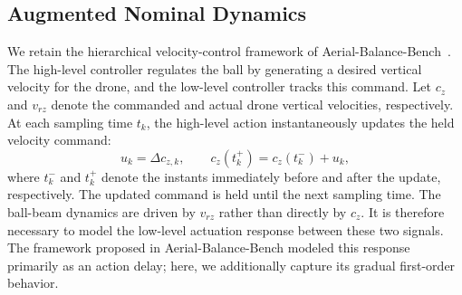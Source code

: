 \documentclass[letterpaper, 10 pt, conference]{ieeeconf}  %
\begin{document}
\subsection{Augmented Nominal Dynamics}
We retain the hierarchical velocity-control framework of Aerial-Balance-Bench~\cite{liu2026aerialBalanceBench}.
The high-level controller regulates the ball by generating a desired vertical velocity for the drone, and the
low-level controller tracks this command. Let $c_z$ and $v_{rz}$ denote the commanded and actual drone vertical
velocities, respectively. At each sampling time $t_k$, the high-level action instantaneously updates the held
velocity command:
\begin{equation}
    u_k=\Delta c_{z,k}, \qquad
    c_z(t_k^+)=c_z(t_k^-)+u_k,
    \label{eq:incremental_velocity_command}
\end{equation}
where $t_k^-$ and $t_k^+$ denote the instants immediately before and after the update, respectively. The updated
command is held until the next sampling time.
The ball-beam dynamics are driven by $v_{rz}$ rather than directly by $c_z$. It is therefore necessary to model
the low-level actuation response between these two signals. The framework proposed in Aerial-Balance-Bench modeled this
response primarily as an action delay; here, we additionally capture its gradual first-order behavior.
\end{document}
